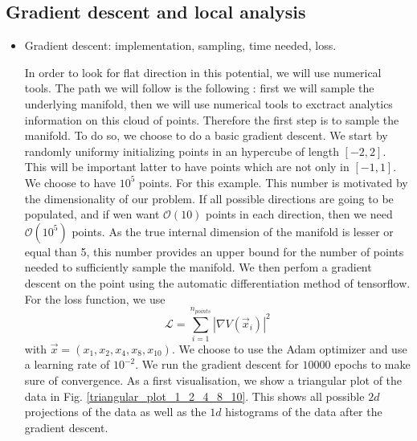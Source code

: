 \documentclass[11pt]{article}
\begin{document}
	\subsection{Gradient descent and local analysis}
	\begin{itemize}[label=\textbullet]
		\item Gradient descent: implementation, sampling, time needed, loss.
		
		In order to look for flat direction in this potential, we will use numerical tools. The path we will follow is the following : first we will sample the underlying manifold, then we will use numerical tools to exctract analytics information on this cloud of points. Therefore the first step is to sample the manifold. To do so, we choose to do a basic gradient descent. We start by randomly uniformy initializing points in an hypercube of length $[-2,2]$. This will be important latter to have points which are not only in $[-1,1]$. We choose to have $10^5$ points. For this example. This number is motivated by the dimensionality of our problem. If all possible directions are going to be populated, and if wen want $\mathcal{O}(10)$ points in each direction, then we need  $\mathcal{O}(10^5)$ points. As the true internal dimension of the manifold is lesser or equal than 5, this number provides an upper bound for the number of points needed to sufficiently sample the manifold.  We then perfom a gradient descent on the point using the automatic differentiation method of tensorflow. For the loss function, we use 
		\begin{equation}
			\mathcal{L} = \sum_{i = 1}^{n_{points}} |\nabla V(\vec{x}_i)|^2
		\end{equation}
		with $\vec{x} = (x_1,x_2,x_4,x_8,x_{10})$. We choose to use the Adam optimizer and use a learning rate of $10^{-2}$. We run the gradient descent for $10000$ epochs to make sure of convergence. 
		As a first visualisation, we show a triangular plot of the data in Fig. \ref{triangular_plot_1_2_4_8_10}. This shows all possible $2d$ projections of the data as well as the $1d$ histograms of the data after the gradient descent. 
		\begin{figure}
			\centering

\end{figure}
\end{itemize}
\end{document}
